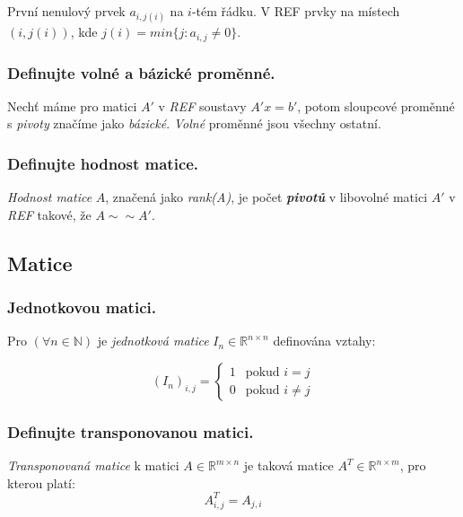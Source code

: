 \documentclass[10pt,a4paper]{article}
\begin{document}
První nenulový prvek $a_{i,j(i)}$ na $i$-tém řádku.
V REF prvky na místech $(i,j(i))$, kde $j(i)=min\{j: a_{i,j} \neq 0\}$.



\subsubsection{Definujte volné a bázické proměnné.}

Nechť máme pro matici $A'$ v \textit{REF} soustavy $A'x = b'$, potom sloupcové proměnné s \textit{pivoty} značíme jako \textit{bázické}. \textit{Volné} proměnné jsou všechny ostatní.

\subsubsection{Definujte hodnost matice.}

\textit{Hodnost matice} $A$, značená jako \textit{rank(A)}, je počet \textbf{\textit{pivotů}} v libovolné matici $A'$ v \textit{REF} takové, že $A \sim \sim A'$.

\newpage

\subsection{Matice}
\subsubsection{Jednotkovou matici.}

Pro $(\forall n \in \mathbb{N})$ je \textit{jednotková matice} $I_n \in \mathbb{R}^{n \times n}$ definována vztahy:

\begin{equation*}
(I_n)_{i,j} = \begin{cases} 
1 &\text{pokud }  i = j \\
0 &\text{pokud }  i \neq j
\end{cases}
\end{equation*}

\subsubsection{Definujte transponovanou matici.}

\textit{Transponovaná matice} k matici $A \in \mathbb{R}^{m \times n}$ je taková matice $A^T \in \mathbb{R}^{n \times m}$, pro kterou platí:
\begin{equation*}
A^T_{i,j} = A_{j,i}
\end{equation*}
 
\end{document}

